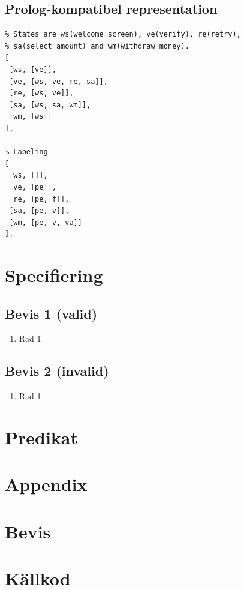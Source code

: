 \documentclass[]{article}
\begin{document}
\clearpage
\subsection{Prolog-kompatibel representation}
\begin{verbatim}
% States are ws(welcome screen), ve(verify), re(retry), 
% sa(select amount) and wm(withdraw money).
[
 [ws, [ve]],
 [ve, [ws, ve, re, sa]],
 [re, [ws, ve]],
 [sa, [ws, sa, wm]],
 [wm, [ws]]
].

% Labeling
[
 [ws, []],
 [ve, [pe]],
 [re, [pe, f]],
 [sa, [pe, v]],
 [wm, [pe, v, va]]
].
\end{verbatim}

\clearpage
\section{Specifiering}

\subsection{Bevis 1 (valid)}


\begin{enumerate}
	\item Rad 1
	
\end{enumerate}

\subsection{Bevis 2 (invalid)}

\begin{enumerate}
	\item Rad 1
	
\end{enumerate}

\section{Predikat}

\clearpage
\section*{Appendix}
\appendix
\section{Bevis}


\clearpage
\section{Källkod}

%
\end{document}
